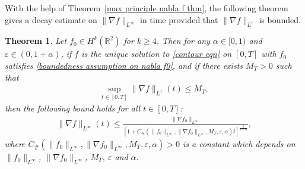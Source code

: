 \documentclass[reqno]{amsart}%
\newtheorem{thm}{Theorem}[section]
\theoremstyle{definition}
\theoremstyle{remark}
\numberwithin{equation}{section}
\newcommand{\0}{\mathbf{0}}
\newcommand{\1}{\mathbf{1}}
\newcommand{\R}{\mathbb R}
\numberwithin{equation}{section}
\numberwithin{theorem}{section}
\numberwithin{figure}{section}
\begin{document}
With the help of Theorem~\ref{max principle nabla f thm}, the following theorem gives a decay estimate on $\|\nabla f\|_{L^\infty}$ in time provided that $\|\nabla f\|_{L^1}$ is bounded.

 \begin{thm}\label{decay of nabla f thm}
Let $f_0\in H^k(\R^2)$ for $k\ge4$. Then for any $\alpha\in[0,1)$ and $\varepsilon\in(0,1+\alpha)$, if $f$ is the unique solution to \eqref{contour eqn} on $[0,T]$ with $f_0$ satisfies \eqref{boundedness assumption on nabla f0}, and if there exists $M_{T}>0$ such that 
\begin{align}\label{boundedness condition on nabla f in L1}
\sup_{t\in[0,T]}\|\nabla f\|_{L^1}(t)\le M_{T},
\end{align}
then the following bound holds for all $t\in[0,T]$:
\begin{align}\label{decay on nabla f in L infty norm}
\|\nabla f\|_{L^\infty}(t)\le\frac{\|\nabla f_0\|_{L^\infty}}{[1+C_{\#}(\|f_0\|_{L^\infty},\|\nabla f_0\|_{L^\infty},M_{T},\varepsilon,\alpha)t]^\frac{2}{1+\alpha}},
\end{align}
where $C_{\#}(\|f_0\|_{L^\infty},\|\nabla f_0\|_{L^\infty},M_{T},\varepsilon,\alpha)>0$ is a constant which depends on $\|f_0\|_{L^\infty}$, $\|\nabla f_0\|_{L^\infty}$, $M_{T}$, $\varepsilon$ and $\alpha$.
\end{thm}
\end{document}
